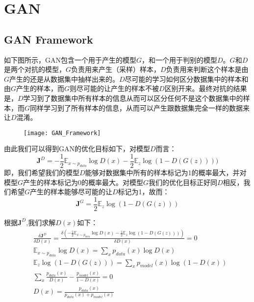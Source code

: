 
\chapter{GAN}
\section{GAN Framework}

如下图所示，GAN包含一个用于产生的模型$G$，和一个用于判别的模型$D$。$G$和$D$是两个对抗的模型，$G$负责用来产生（采样）样本，$D$负责用来判断这个样本是由$G$产生的还是从数据集中抽样出来的。$D$尽可能的学习如何区分数据集中的样本和由$G$产生的样本，而$G$则尽可能的让产生的样本不被$D$区别开来。最终对抗的结果是，$D$学习到了数据集中所有样本的信息从而可以区分任何不是这个数据集中的样本，而$G$同样学习到了所有样本的信息，从而可以产生跟数据集完全一样的数据来让$D$混淆。

 \begin{figure}[htbp]
 \centering
 \texttt{[image: GAN\_Framework]}
 \end{figure}


由此我们可以得到GAN的优化目标如下，对模型$D$而言：
\begin{displaymath}
\mathbf{J}^{D}=-\frac{1}{2}\mathbb{E}_{{x}\sim p_{data}}\log{D({x})}-\frac{1}{2}\mathbb{E}_{{z}}\log(1-D(G({z}))))
\end{displaymath}
即，我们希望我们的模型$D$能够对数据集中所有的样本标记为1的概率最大，并对模型$G$产生的样本标记为0的概率最大。对模型$G$我们的优化目标正好同$D$相反，我们希望$G$产生的样本能够尽可能的让$D$标记为1，故而：
\begin{displaymath}
\mathbf{J}^{G}=\frac{1}{2}\mathbb{E}_{{z}}\log{(1-D(G({z})))}
\end{displaymath}

根据$\mathbf{J}^{D}$,我们求解$D(x)$如下：
\begin{displaymath}
\begin{split}
&\frac{\delta \mathbf{J}^{D}}{\delta D(x)} = \frac{\delta (-\frac{1}{2}\mathbb{E}_{{x}\sim p_{data}}\log{D({x})}-\frac{1}{2}\mathbb{E}_{{z}}\log(1-D(G({z}))))}{\delta D(x)} =0\\
&\mathbb{E}_{{x}\sim p_{data}}\log{D({x})} = \sum_{x}{p_{data}(x)\log{D(x)}}\\
&\mathbb{E}_{z}\log{(1-D(G(z)))} = \sum_{x}{p_{model}(x)\log{(1-D(x))}}\\
&\sum_{x}{\frac{p_{data}(x)}{D(x)} - \frac{p_{model}(x)}{1-D(x)}} = 0\\
&D(x) = \frac{p_{data}(x)}{p_{data}(x) + p_{model}(x)}\\
\end{split}
\end{displaymath}

